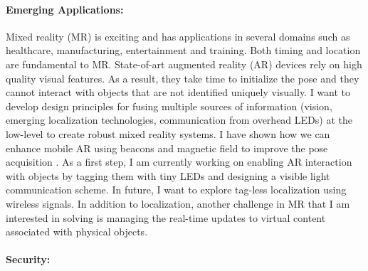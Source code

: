 \documentclass[10pt]{article}
\begin{document}

\paragraph{Emerging Applications: }

Mixed reality (MR) is exciting and has applications in several domains such as healthcare, manufacturing, entertainment and training.
Both timing and location are fundamental to MR. State-of-art augmented reality (AR) devices rely on high quality visual features. As a result, they take time to initialize the pose and they cannot interact with objects that 
are not identified uniquely visually.  %
I want to develop design principles for fusing multiple sources of information (vision, emerging localization technologies, communication from overhead LEDs) at the low-level to create robust mixed reality systems. %
I have shown how we can enhance mobile AR using beacons and magnetic field to improve the pose acquisition \cite{mobileAR}. As a first step, I am currently working on enabling AR interaction with objects by tagging them with tiny LEDs and designing a visible light communication scheme. In future, I want to explore tag-less localization using wireless signals. In addition to localization, another challenge in MR that I am interested in solving is managing the real-time updates to virtual content associated with physical objects. %



\paragraph{Security: }
\end{document}

